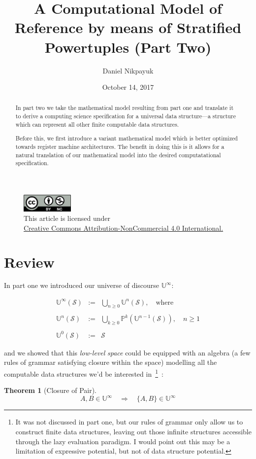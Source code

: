 \documentclass[twoside]{article}
\title{A Computational Model of Reference by means of Stratified Powertuples (Part Two)}
\author{Daniel Nikpayuk}
\date{October 14, 2017}
\newcommand{\nthus}[2][U]{\ensuremath{\mathbb{#1}^{#2}}}
\newcommand{\psunion}[2][P]{\ensuremath{\bigcup_{#2\ge 0}\mathbb{#1}^{#2}}}
\newcommand{\usunion}[2][U]{\ensuremath{\bigcup_{#2\ge 0}\mathbb{#1}^{#2}}}
\newcommand{\stratified}{\ensuremath{\mathbb{U}^\infty}}
\newcommand{\of}[1]{\ensuremath{(\mathcal{#1})}}
\newcommand{\then}{\ensuremath{\quad\Longrightarrow\quad}}
\newtheorem{theorem}{Theorem}
\newenvironment{definition}[1][Definition]{\begin{trivlist}
\item[\hskip \labelsep {\bfseries #1:}]}{\end{trivlist}}
\begin{document}
\maketitle
\thispagestyle{empty}

\begin{figure}[h]
\centering
\includegraphics[width=1in]{cc-by-nc.png}\\[0.1in]
\tiny This article is licensed under \\
\href{http://creativecommons.org/licenses/by-nc/4.0/}
{Creative Commons Attribution-NonCommercial 4.0 International.}\\[0.3in]
\end{figure}

\begin{abstract}
In part two we take the mathematical model resulting from part one and translate it to derive a computing science
specification for a universal data structure---a structure which can represent all other finite computable data structures.

Before this, we first introduce a variant mathematical model which is better optimized towards register machine architectures.
The benefit in doing this is it allows for a natural translation of our mathematical model into the desired computatational
specification.
\end{abstract}

\section*{Review}

In part one we introduced our universe of discourse $ \stratified $:
\begin{definition}[Stratified Powerset]
$$ \begin{array}{rcl}
\stratified\of{S}	& :=	& \usunion{n}\of{S},\quad\mbox{where}		\\
										\\
\nthus{n}\of{S}		& :=	& \psunion{k}(\nthus{n-1}\of{S}),\quad n\ge 1	\\
										\\
\nthus{0}\of{S}		& :=	& \mathcal{S}
\end{array} $$
\end{definition}
and we showed that this \emph{low-level} \emph{space} could be equipped with an algebra
(a few rules of grammar satisfying closure within the space) modelling all the computable data structures we'd be interested
in\ \footnote{It was not discussed in part one, but our rules of grammar only allow us to construct finite data structures,
leaving out those infinite structures accessible through the lazy evaluation paradigm. I would point out this may be
a limitation of expressive potential, but not of data structure potential.}\ :
\begin{theorem}[Closure of Pair]
$$ A,B\in\stratified\then\{A,B\}\in\stratified $$
\end{theorem}
\end{document}
